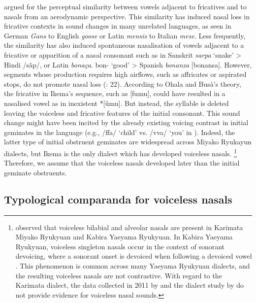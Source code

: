 \documentclass[output=paper]{langscibook}
\begin{document}
\citet{OhalaBusà1995} argued for the perceptual similarity between vowels adjacent to fricatives and to nasals from an aerodynamic perspective. This similarity has induced nasal loss in fricative contexts in sound changes in many unrelated languages, as seen in German \textit{Gans} to English \textit{goose} or Latin \textit{mensis} to Italian \textit{mese}. Less frequently, the similarity has also induced spontaneous nasalisation of vowels adjacent to a fricative or apparition of a nasal consonant such as in Sanskrit \textit{sarpa} ‘snake’ > Hindi /sãp/, or Latin \textit{bonaça}. bon- ‘good’ > Spanish \textit{bonanza} [bonansa]. However, segments whose production requires high airflows, such as affricates or aspirated stops, do not promote nasal loss (\citealt{OhalaBusà1995}: 22). According to Ohala and Busà’s theory, the fricative in Ikema’s sequence, such as [fumu], could have resulted in a nasalised vowel as in inexistent *[\~umu]. But instead, the syllable is deleted leaving the voiceless and fricative features of the initial consonant. This sound change might have been incited by the already existing voicing contrast in initial geminates in the language (e.g., /ffa/ ‘child’ vs. /vva/ ‘you’ in ). Indeed, the latter type of initial obstruent geminates are widespread across Miyako Ryukayun dialects, but Ikema is the only dialect which has developed voiceless nasals. \footnote{\citet{Uchima1984} observed that voiceless bilabial and alveolar nasals are present in Karimata Miyako Ryukyuan and Kabira Yaeyama Ryukyuan. In Kabira Yaeyama Ryukyuan, voiceless singleton nasals occur in the context of sonorant devoicing, where a sonorant onset is devoiced when following a devoiced vowel \citep{Kajiku1984}. This phenomenon is common across many Yaeyama Ryukyuan dialects, and the resulting voiceless nasals are not contrastive. With regard to the Karimata dialect, the data collected in 2011 by \citet{Kibe2012} and the dialect study by \citet{KinuhataHayashi2014} do not provide evidence for voiceless nasal sounds.} Therefore, we assume that the voiceless nasals developed later than the initial geminate obstruents.

\subsection{Typological comparanda for voiceless nasals}
\label{sec:shinohara:1.4}
\end{document}
